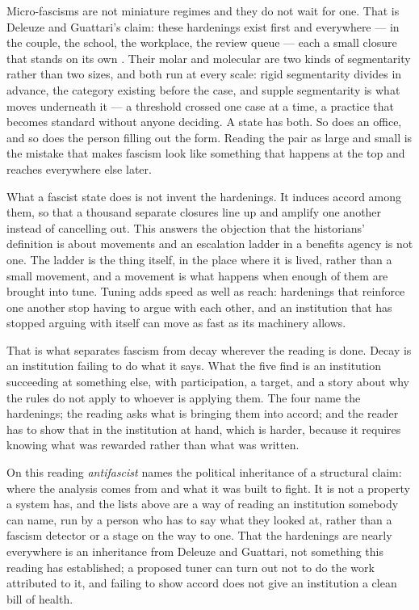 Micro-fascisms are not miniature regimes and they do not wait for one. That is Deleuze and Guattari's claim: these hardenings exist first and everywhere — in the couple, the school, the workplace, the review queue — each a small closure that stands on its own \autocite{deleuze1987plateaus}. Their molar and molecular are two kinds of segmentarity rather than two sizes, and both run at every scale: rigid segmentarity divides in advance, the category existing before the case, and supple segmentarity is what moves underneath it — a threshold crossed one case at a time, a practice that becomes standard without anyone deciding. A state has both. So does an office, and so does the person filling out the form. Reading the pair as large and small is the mistake that makes fascism look like something that happens at the top and reaches everywhere else later.

What a fascist state does is not invent the hardenings. It induces accord among them, so that a thousand separate closures line up and amplify one another instead of cancelling out. This answers the objection that the historians' definition is about movements and an escalation ladder in a benefits agency is not one. The ladder is the thing itself, in the place where it is lived, rather than a small movement, and a movement is what happens when enough of them are brought into tune. Tuning adds speed as well as reach: hardenings that reinforce one another stop having to argue with each other, and an institution that has stopped arguing with itself can move as fast as its machinery allows.

That is what separates fascism from decay wherever the reading is done. Decay is an institution failing to do what it says. What the five find is an institution succeeding at something else, with participation, a target, and a story about why the rules do not apply to whoever is applying them. The four name the hardenings; the reading asks what is bringing them into accord; and the reader has to show that in the institution at hand, which is harder, because it requires knowing what was rewarded rather than what was written.

On this reading \emph{antifascist} names the political inheritance of a structural claim: where the analysis comes from and what it was built to fight. It is not a property a system has, and the lists above are a way of reading an institution somebody can name, run by a person who has to say what they looked at, rather than a fascism detector or a stage on the way to one. That the hardenings are nearly everywhere is an inheritance from Deleuze and Guattari, not something this reading has established; a proposed tuner can turn out not to do the work attributed to it, and failing to show accord does not give an institution a clean bill of health.

